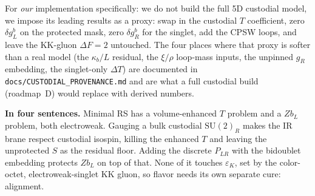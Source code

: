 \documentclass[11pt]{article}
\begin{document}
For \emph{our} implementation specifically: we do not build the full 5D custodial
model, we impose its leading results as a proxy: swap in the custodial $T$
coefficient, zero $\delta g_L^b$ on the protected mask, zero $\delta g_R^b$ for the
singlet, add the CPSW loops, and leave the KK-gluon $\Delta F=2$ untouched. The four
places where that proxy is softer than a real model (the $\kappa_b/L$ residual, the
$\xi/\rho$ loop-mass inputs, the unpinned $g_R$ embedding, the singlet-only $\Delta T$)
are documented in \texttt{docs/CUSTODIAL\_PROVENANCE.md} and are what a full custodial
build (roadmap~D) would replace with derived numbers.

\vspace{0.5em}
\hrulefill

\textbf{In four sentences.} Minimal RS has a volume-enhanced $T$ problem and a
$Z b_L$ problem, both electroweak. Gauging a bulk custodial $\mathrm{SU(2)}_R$ makes
the IR brane respect custodial isospin, killing the enhanced $T$ and leaving the
unprotected $S$ as the residual floor. Adding the discrete $P_{LR}$ with the bidoublet
embedding protects $Z b_L$ on top of that. None of it touches $\varepsilon_K$, set by
the color-octet, electroweak-singlet KK gluon, so flavor needs its own separate cure:
alignment.
\end{document}
